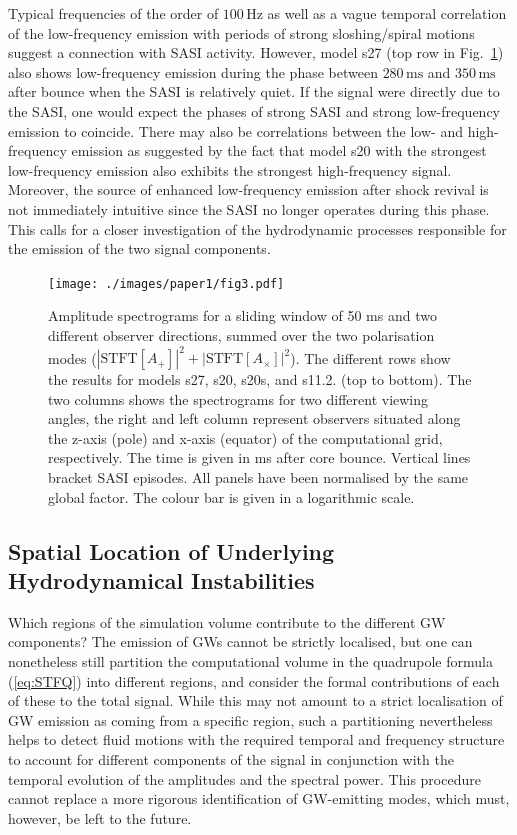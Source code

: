 Typical frequencies of the order of $100 \, \mathrm{Hz}$ as well as a
vague temporal correlation of the low-frequency emission with periods
of strong sloshing/spiral motions suggest a connection with
SASI activity. However, model s27 (top row in
Fig.~\ref{fig:spectrograms}) also shows low-frequency emission during
the phase between $280 \, \mathrm{ms}$ and $350 \, \mathrm{ms}$ after
bounce when the SASI is relatively quiet. If the signal were
directly due to the SASI, one would expect the phases of strong SASI
and strong low-frequency emission to coincide. There may also be
correlations between the low- and high-frequency emission as suggested
by the fact that model s20 with the strongest
low-frequency emission also exhibits the strongest high-frequency
signal. Moreover, the source of enhanced low-frequency emission after
shock revival is not immediately intuitive since the SASI no longer
operates during this phase.  This calls for a closer investigation of
the hydrodynamic processes responsible for the emission of the two
signal components.

\begin{figure}
\centering                                                                             
\texttt{[image: ./images/paper1/fig3.pdf]} \\
\caption{Amplitude spectrograms for a sliding window of 50 ms and two different observer
  directions, summed over the two polarisation modes 
  ($|\text{STFT}[{A_+}]|^2 + |\text{STFT}[{A_{\times}}]|^2$). The
  different rows show the results for models s27, s20, s20s, and s11.2. (top to bottom).
  The two columns shows the spectrograms for two different viewing angles, the right and left column represent
  observers situated along the z-axis (pole) and x-axis (equator) of the computational grid, respectively.
  The time is given in ms after core bounce. Vertical lines bracket SASI episodes. All panels have been normalised by the same global factor.
  The colour bar is given in a logarithmic scale.
\label{fig:spectrograms}}
\end{figure}

\subsection{Spatial Location of Underlying Hydrodynamical Instabilities} \label{sec:spaceloc}
Which regions of the simulation volume contribute to the different GW
components? The emission of GWs cannot be strictly
localised, but one can nonetheless still partition the computational volume 
in the quadrupole formula (\ref{eq:STFQ}) into different regions,
and consider the formal contributions of each of these to the total
signal. While this may not amount to a strict localisation
of GW emission as coming from  a specific region, such a partitioning
nevertheless helps to detect fluid motions with the required
temporal and frequency structure to account for different components
of the signal {in conjunction with the temporal
evolution of the amplitudes and the spectral power. This procedure
cannot replace a more rigorous identification of GW-emitting modes,
which must, however, be left to the future.}


